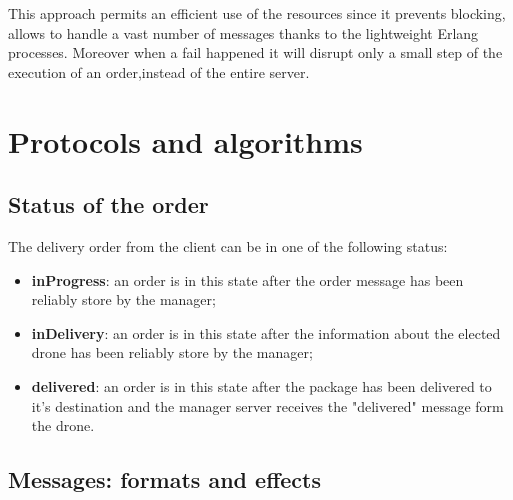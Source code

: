 \documentclass[a4paper, oneside]{memoir}
\begin{document}
This approach permits an efficient use of the resources since it prevents blocking, allows to handle a vast number of messages thanks to the lightweight Erlang processes. Moreover when a fail happened it will disrupt only a small step of the execution of an order,instead of the entire server.


\section{Protocols and algorithms}


\subsection{Status of the order}
The delivery order from the client can be in one of the following status:
\begin{itemize}
\item \textbf{inProgress}: an order is in this state after the order message has been reliably store by the manager;
\item \textbf{inDelivery}: an order is in this state after the information about the elected drone has been reliably store by the manager;
\item \textbf{delivered}: an order is in this state after the package has been delivered to it's destination and the manager server receives the "delivered" message form the drone.
\end{itemize}


\subsection{Messages: formats and effects}
\end{document}
